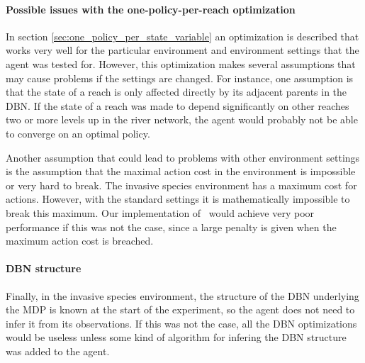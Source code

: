 \paragraph{Possible issues with the one-policy-per-reach optimization} In section \ref{sec:one_policy_per_state_variable} an optimization is described that works very well for the particular environment and environment settings that the agent was tested for. However, this optimization makes several assumptions that may cause problems if the settings are changed. For instance, one assumption is that the state of a reach is only affected directly by its adjacent parents in the DBN. If the state of a reach was made to depend significantly on other reaches two or more levels up in the river network, the agent would probably not be able to converge on an optimal policy. 

Another assumption that could lead to problems with other environment settings is the assumption that the maximal action cost in the environment is impossible or very hard to break. The invasive species environment has a maximum cost for actions. However, with the standard settings it is mathematically impossible to break this maximum. Our implementation of \etre\ would achieve very poor performance if this was not the case, since a large penalty is given when the maximum action cost is breached. 

\paragraph{DBN structure} Finally, in the invasive species environment, the structure of the DBN underlying the MDP is known at the start of the experiment, so the agent does not need to infer it from its observations. If this was not the case, all the DBN optimizations would be useless unless some kind of algorithm for infering the DBN structure was added to the agent. 
